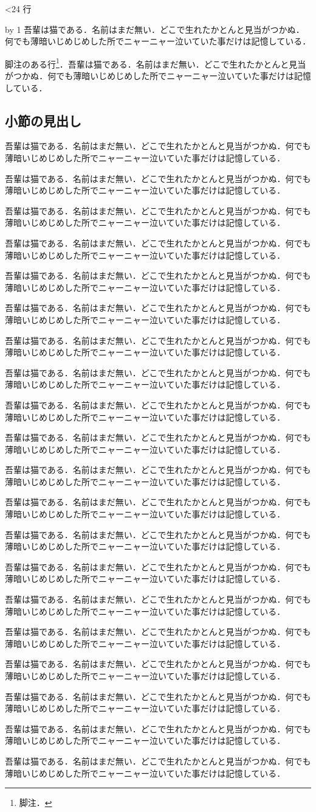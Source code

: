 \documentclass[twocolumn,paper=a4,fontsize=10pt]{jlreq}
\newcommand\para{吾輩は猫である．名前はまだ無い．どこで生れたかとんと見当がつかぬ．何でも薄暗いじめじめした所でニャーニャー泣いていた事だけは記憶している．\par}
\begin{document}
 \loop\ifnum\n<24 行\the\n\par \advance\n by 1 \repeat
\para 脚注のある行\footnote{脚注．}．\para
\subsection{小節の見出し}
\para\para\para\para\para\para\para\para\para\para\para\para\para\para\para\para\para\para\para\para
\end{document}
